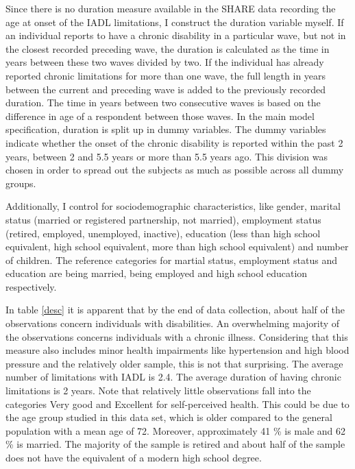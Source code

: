 \documentclass[12pt]{article}
\begin{document}
Since there is no duration measure available in the SHARE data recording the age at onset of the IADL limitations, I construct the duration variable myself. If an individual reports to have a chronic disability in a particular wave, but not in the closest recorded preceding wave, the duration is calculated as the time in years between these two waves divided by two. If the individual has already reported chronic limitations for more than one wave, the full length in years between the current and preceding wave is added to the previously recorded duration. The time in years between two consecutive waves is based on the difference in age of a respondent between those waves. In the main model specification, duration is split up in dummy variables. The dummy variables indicate whether the onset of the chronic disability is reported within the past 2 years, between 2 and 5.5 years or more than 5.5 years ago. This division was chosen in order to spread out the subjects as much as possible across all dummy groups. 

Additionally, I control for sociodemographic characteristics, like gender, marital status (married or registered partnership, not married), employment status (retired, employed, unemployed, inactive), education (less than high school equivalent, high school equivalent, more than high school equivalent) and number of children. The reference categories for martial status, employment status and education are being married, being employed and high school education respectively.    

In table \ref{desc} it is apparent that by the end of data collection, about half of the observations concern individuals with disabilities. An overwhelming majority of the observations concerns individuals with a chronic illness. Considering that this measure also includes minor health impairments like hypertension and high blood pressure and the relatively older sample, this is not that surprising. The average number of limitations with IADL is 2.4. The average duration of having chronic limitations is 2 years. Note that relatively little observations fall into the categories Very good and Excellent for self-perceived health. This could be due to the age group studied in this data set, which is older compared to the general population with a mean age of 72. Moreover, approximately 41 \% is male and 62 \% is married. The majority of the sample is retired and about half of the sample does not have the equivalent of a modern high school degree. 
\end{document}
